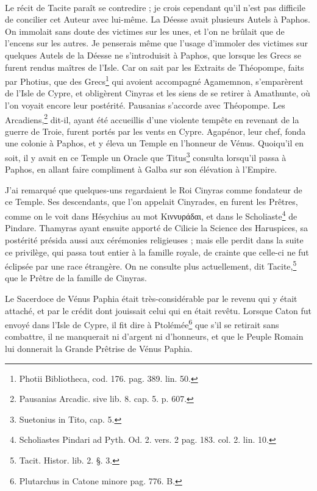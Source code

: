 \documentclass[a4paper, 11pt, oneside, polutonikogreek, french]{article}
\begin{document}
\paragraph{}
Le récit de Tacite paraît se contredire ; je crois cependant qu'il n'est pas difficile de concilier cet Auteur avec lui-même. La Déesse avait plusieurs Autels à Paphos. On immolait sans doute des victimes sur les unes, et l'on ne brûlait que de l'encens sur les autres. Je penserais même que l'usage d'immoler des victimes sur quelques Autels de la Déesse ne s'introduisit à Paphos, que lorsque les Grecs se furent rendus maîtres de l'Isle. Car on sait par les Extraits de Théopompe, faits par Photius, que des Grecs\footnote{Photii Bibliotheca, cod. 176. pag. 389. lin. 50.} qui avoient accompagné Agamemnon, s'emparèrent de l'Isle de Cypre, et obligèrent Cinyras et les siens de se retirer à Amathunte, où l'on voyait encore leur postérité. Pausanias s'accorde avec Théopompe. Les Arcadiens,\footnote{Pausanias Arcadic. sive lib. 8. cap. 5. p. 607.} dit-il, ayant été accueillis d'une violente tempête en revenant de la guerre de Troie, furent portés par les vents en Cypre. Agapénor, leur chef, fonda une colonie à Paphos, et y éleva un Temple en l'honneur de Vénus. Quoiqu'il en soit, il y avait en ce Temple un Oracle que Titus\footnote{Suetonius in Tito, cap. 5.} consulta lorsqu'il passa à Paphos, en allant faire compliment à Galba sur son élévation à l'Empire.

J'ai remarqué que quelques-uns regardaient le Roi Cinyras comme fondateur de ce Temple. Ses descendants, que l'on appelait Cinyrades, en furent les Prêtres, comme on le voit dans Hésychius au mot Κιννυράδαι, et dans le Scholiaste\footnote{Scholiastes Pindari ad Pyth. Od. 2. vers. 2 pag. 183. col. 2. lin. 10.} de Pindare. Thamyras ayant ensuite apporté de Cilicie la Science des Haruspices, sa postérité présida aussi aux cérémonies religieuses ; mais elle perdit dans la suite ce privilège, qui passa tout entier à la famille royale, de crainte que celle-ci ne fut éclipsée par une race étrangère. On ne consulte plus actuellement, dit Tacite,\footnote{Tacit. Histor. lib. 2. §. 3.} que le Prêtre de la famille de Cinyras.

Le Sacerdoce de Vénus Paphia était très-considérable par le revenu qui y était attaché, et par le crédit dont jouissait celui qui en était revêtu. Lorsque Caton fut envoyé dans l'Isle de Cypre, il fit dire à Ptolémée\footnote{Plutarchus in Catone minore pag. 776. B.} que s'il se retirait sans combattre, il ne manquerait ni d'argent ni d'honneurs, et que le Peuple Romain lui donnerait la Grande Prêtrise de Vénus Paphia.
\end{document}
